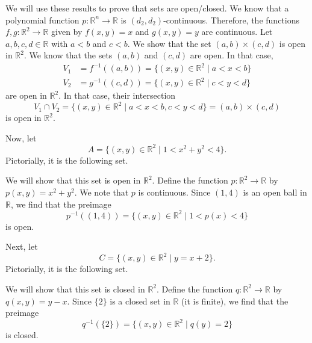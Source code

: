 \documentclass[a4paper, openany]{memoir}
\theoremstyle{definition}
\theoremstyle{plain}
\begin{document}
We will use these results to prove that sets are open/closed. We know that a polynomial function $p: \mathbb{R}^n \to \mathbb{R}$ is $(d_2, d_2)$-continuous. Therefore, the functions $f, g: \mathbb{R}^2 \to \mathbb{R}$ given by $f(x, y) = x$ and $g(x, y) = y$ are continuous. Let $a, b, c, d \in \mathbb{R}$ with $a < b$ and $c < b$. We show that the set $(a, b) \times (c, d)$ is open in $\mathbb{R}^2$. We know that the sets $(a, b)$ and $(c, d)$ are open. In that case,
\begin{align*}
    V_1 &= f^{-1}((a, b)) = \{(x, y) \in \mathbb{R}^2 \mid a < x < b\} \\
    V_2 &= g^{-1}((c, d)) = \{(x, y) \in \mathbb{R}^2 \mid c < y < d\} 
\end{align*}
are open in $\mathbb{R}^2$. In that case, their intersection
\[V_1 \cap V_2 = \{(x, y) \in \mathbb{R}^2 \mid a < x < b, c < y < d\} = (a, b) \times (c, d)\]
is open in $\mathbb{R}^2$.

Now, let
\[A = \{(x, y) \in \mathbb{R}^2 \mid 1 < x^2 + y^2 < 4\}.\]
Pictorially, it is the following set.
\begin{figure}[H]
    \centering
\end{figure}
\noindent We will show that this set is open in $\mathbb{R}^2$. Define the function $p: \mathbb{R}^2 \to \mathbb{R}$ by $p(x, y) = x^2 + y^2$. We note that $p$ is continuous. Since $(1, 4)$ is an open ball in $\mathbb{R}$, we find that the preimage
\[p^{-1}((1, 4)) = \{(x, y) \in \mathbb{R}^2 \mid 1 < p(x) < 4\}\]
is open.

Next, let
\[C = \{(x, y) \in \mathbb{R}^2 \mid y = x + 2\}.\]
Pictorially, it is the following set.
\begin{figure}[H]
    \centering
\end{figure}
\noindent We will show that this set is closed in $\mathbb{R}^2$. Define the function $q: \mathbb{R}^2 \to \mathbb{R}$ by $q(x, y) = y - x$. Since $\{2\}$ is a closed set in $\mathbb{R}$ (it is finite), we find that the preimage
\[q^{-1}(\{2\}) = \{(x, y) \in \mathbb{R}^2 \mid q(y) = 2\}\]
is closed. 
\end{document}
